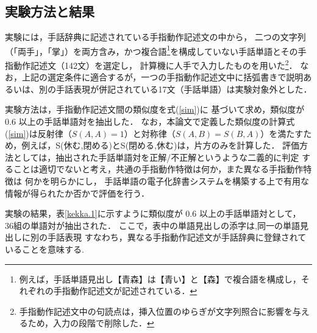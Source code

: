 \subsection {実験方法と結果}

実験には，手話辞典\cite{MaruyamaKoji1984}に記述されている手指動作記述文の中から，
二つの文字列（「両手」，「掌」）を両方含み，かつ複合語\footnote{例えば，手話単語見出し【青森】は【青い】と【森】で複合語を構成し，それぞれの手指動作記述文が記述されている．}を構成していない手話単語とその手指動作記述文（142文）を選定し，
計算機に人手で入力したものを用いた\footnote{手指動作記述文中の句読点は，挿入位置のゆらぎが文字列照合に影響を与えるため，入力の段階で削除した．}．
なお，上記の選定条件に適合するが，一つの手指動作記述文中に括弧書きで説明あるいは、別の手話表現が併記されている17文（手話単語）は実験対象外とした．

実験方法は，手指動作記述文間の類似度を式(\ref{sim})に
基づいて求め，類似度が 0.6 以上の手話単語対を抽出した．
なお，本論文で定義した類似度の計算式(\ref{sim})は反射律（$S(A,A)=1$）と対称律（$S(A,B)=S(B,A)$）を満たすため，例えば，S(休む,閉める)とS(閉める,休む)は，片方のみを計算した．
評価方法としては，抽出された手話単語対を正解/不正解というような二義的に判定
することは適切でないと考え，共通の手指動作特徴は何か，また異なる手指動作特徴は
何かを明らかにし，
手話単語の電子化辞書システムを構築する上で有用な情報が得られたか否かで評価を行う．

実験の結果，表\ref{kekka.1}に示すように類似度が 0.6 以上の手話単語対として，
36組の単語対が抽出された．
ここで，表中の単語見出しの添字は,同一の単語見出しに別の手話表現
すなわち，異なる手指動作記述文が手話辞典\cite{MaruyamaKoji1984}に登録されていることを意味する.

